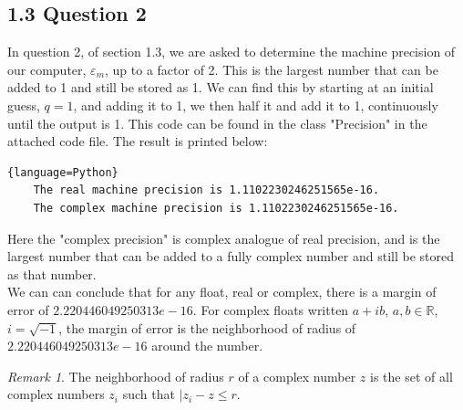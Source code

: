 \documentclass{article}
\theoremstyle{definition}
\theoremstyle{remark}
\newtheorem*{remark}{Remark}
\begin{document}
\subsection{1.3 Question 2}
In question 2, of section 1.3, we are asked to determine the machine precision of our computer, $\varepsilon_m$, up to a factor of 2. This is the largest number that can be added to 1 and still be stored as 1. We can find this by starting at an initial guess, $q = 1$, and adding it to 1, we then half it and add it to 1, continuously until the output is 1. This code can be found in the class "Precision" in the attached code file. The result is printed below:
\begin{lstlisting}{language=Python}
    The real machine precision is 1.1102230246251565e-16.
    The complex machine precision is 1.1102230246251565e-16.
\end{lstlisting}
Here the "complex precision" is complex analogue of real precision, and is the largest number that can be added to a fully complex number and still be stored as that number. \\
\indent We can can conclude that for any float, real or complex, there is a margin of error of $2.220446049250313e-16$. For complex floats written $a+ib$, $a,b\in\mathbb{R}$, $i=\sqrt{-1}$, the margin of error is the neighborhood of radius of $2.220446049250313e-16$ around the number.
\begin{remark}
    The neighborhood of radius $r$ of a complex number $z$ is the set of all complex numbers $z_i$ such that  $|z_i-z\leq r$.
\end{remark}
\end{document}
